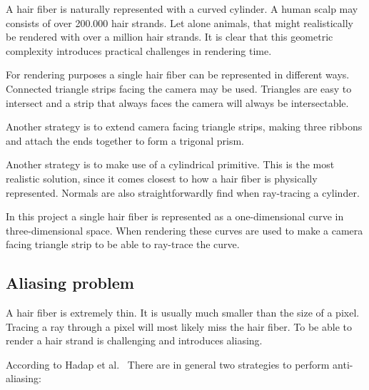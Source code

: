 \documentclass[11pt,a4paper]{report}
\begin{document}
A hair fiber is naturally represented with a curved cylinder. A human scalp may consists of over 200.000 hair strands. Let alone animals, that might realistically be rendered with over a million hair strands. It is clear that this geometric complexity introduces practical challenges in rendering time. 

For rendering purposes a single hair fiber can be represented in different ways. Connected triangle strips facing the camera may be used. Triangles are easy to intersect and a strip that always faces the camera will always be intersectable.

Another strategy is to extend camera facing triangle strips, making three ribbons and attach the ends together to form a trigonal prism.

Another strategy is to make use of a cylindrical primitive. This is the most realistic solution, since it comes closest to how a hair fiber is physically represented. Normals are also straightforwardly find when ray-tracing a cylinder.

In this project a single hair fiber is represented  as a one-dimensional curve in three-dimensional space. When rendering these curves are used to make a camera facing triangle strip to be able to ray-trace the curve.

\subsection{Aliasing problem}

A hair fiber is extremely thin. It is usually much smaller than the size of a pixel. Tracing a ray through a pixel will most likely miss the hair fiber.  To be able to render a hair strand is challenging and introduces aliasing. 

According to Hadap et al.~\cite{hadap} There are in general two strategies to perform anti-aliasing:
\end{document}
